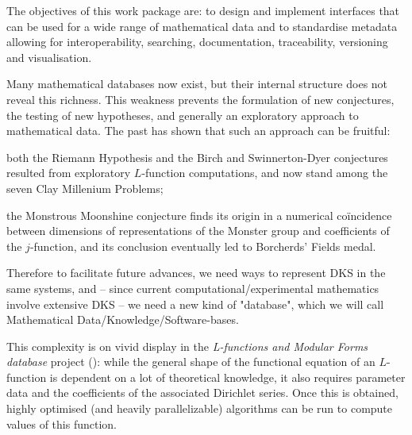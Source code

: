 \begin{workpackage}[id=dksbases,wphases=1-48!.5,
  title=Data/Knowledge/Software-Bases,lead=JU,
  ZHRM=12,JURM=36,UWRM=25,SARM=10,LLRM=2,PSRM=4]


\begin{wpobjectives}
  The objectives of this work package are: to design and implement interfaces that can be
  used for a wide range of mathematical data and to standardise metadata allowing for
  interoperability, searching, documentation, traceability, versioning and visualisation.
\end{wpobjectives}

\begin{wpdescription}
  Many mathematical databases now exist, but their internal structure does not reveal this
  richness. This weakness prevents the formulation of new conjectures, the testing of new
  hypotheses, and generally an exploratory approach to mathematical data. The past has
  shown that such an approach can be fruitful:
  \begin{compactitem}
  \item both the Riemann Hypothesis and the Birch and Swinnerton-Dyer conjectures resulted
    from exploratory $L$-function computations, and now stand among the seven Clay
    Millenium Problems;
  \item the Monstrous Moonshine conjecture finds its origin in a numerical co\"incidence
    between dimensions of representations of the Monster group and coefficients of the
    $j$-function, and its conclusion eventually led to Borcherds' Fields medal.
  \end{compactitem}

  Therefore to facilitate future advances, we need ways to represent DKS in the same
  systems, and -- since current computational/experimental mathematics involve extensive
  DKS -- we need a new kind of "database", which we will call Mathematical
  Data/Knowledge/Software-bases.

  This complexity is on vivid display in the \emph{L-functions and Modular Forms database}
  project (\LMFDB): while the general shape of the functional equation of an $L$-function
  is dependent on a lot of theoretical knowledge, it also requires parameter data and the
  coefficients of the associated Dirichlet series. Once this is obtained, highly optimised
  (and heavily parallelizable) algorithms can be run to compute values of this function.


\end{wpdescription}
\end{workpackage}
